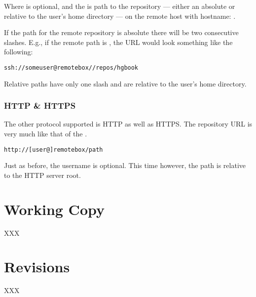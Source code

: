 Where  is optional, and the  is path to the
repository --- either an absolute or relative to the user's home directory
--- on the remote host with hostname: .

\begin{note}
If the path for the remote repository is absolute there will be two
consecutive slashes.  E.g., if the remote path is ,
the URL would look something like the following:

\begin{verbatim}
ssh://someuser@remotebox//repos/hgbook
\end{verbatim}

Relative paths have only one slash and are relative to the user's home
directory.
\end{note}

\subsubsection{HTTP \& HTTPS}
\label{sec:concepts:remoterepo:http}
The other protocol supported is HTTP as well as HTTPS.  The repository URL
is very much like that of the .

\begin{verbatim}
http://[user@]remotebox/path
\end{verbatim}

Just as before, the username is optional.
This time however, the path is relative to the HTTP server root.  

\section{Working Copy}
\label{sec:concepts:workingcopy}
XXX

\section{Revisions}
\label{sec:concepts:revs}
XXX


